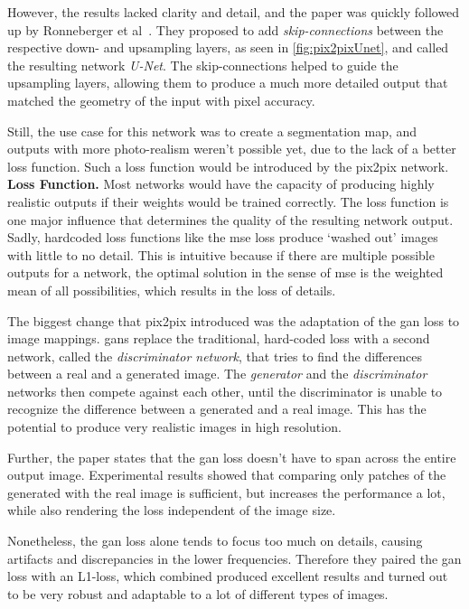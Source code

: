 However, the results lacked clarity and detail, and the paper was quickly followed up by Ronneberger et al~\cite{unet}. They proposed to add \emph{skip-connections} between the respective down- and upsampling layers, as seen in \cref{fig:pix2pixUnet}, and called the resulting network \emph{U-Net}. The skip-connections helped to guide the upsampling layers, allowing them to produce a much more detailed output that matched the geometry of the input with pixel accuracy.

Still, the use case for this network was to create a segmentation map, and outputs with more photo-realism weren't possible yet, due to the lack of a better loss function. Such a loss function would be introduced by the \gls{pix2pix} network.\\

\textbf{Loss Function.} Most networks would have the capacity of producing highly realistic outputs if their weights would be trained correctly. The loss function is one major influence that determines the quality of the resulting network output. Sadly, hardcoded loss functions like the \gls{mse} loss produce `washed out' images with little to no detail. This is intuitive because if there are multiple possible outputs for a network, the optimal solution in the sense of \gls{mse} is the weighted mean of all possibilities, which results in the loss of details.

The biggest change that \gls{pix2pix} introduced was the adaptation of the \gls{gan} loss to image mappings. \glspl{gan} replace the traditional, hard-coded loss with a second network, called the \emph{discriminator network}, that tries to find the differences between a real and a generated image. The \emph{generator} and the \emph{discriminator} networks then compete against each other, until the discriminator is unable to recognize the difference between a generated and a real image. This has the potential to produce very realistic images in high resolution.

Further, the paper states that the \gls{gan} loss doesn't have to span across the entire output image. Experimental results showed that comparing only patches of the generated with the real image is sufficient, but increases the performance a lot, while also rendering the loss independent of the image size.

Nonetheless, the \gls{gan} loss alone tends to focus too much on details, causing artifacts and discrepancies in the lower frequencies. Therefore they paired the \gls{gan} loss with an L1-loss, which combined produced excellent results and turned out to be very robust and adaptable to a lot of different types of images.

